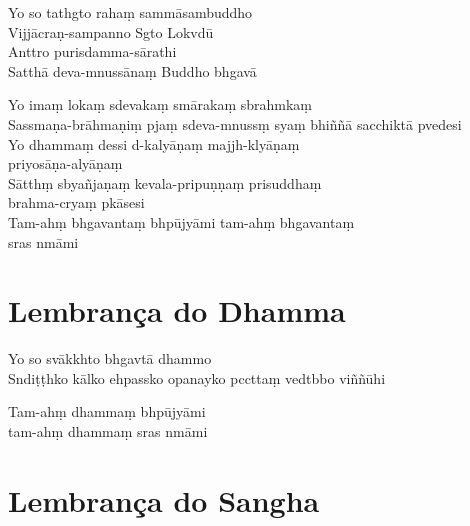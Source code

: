 \begin{leader}
\end{leader}

Yo so tathgto rahaṃ sammāsambuddho\\
Vijjācraṇ-sampanno Sgto Lokvdū\\
Anttro purisdamma-sārathi\\
Satthā deva-mnussānaṃ Buddho bhgavā

Yo imaṃ lokaṃ sdevakaṃ smārakaṃ sbrahmkaṃ\\
Sassmaṇa-brāhmaṇiṃ pjaṃ sdeva-mnussṃ syaṃ bhiññā sacchiktā pvedesi\\
Yo dhammaṃ dessi d-kalyāṇaṃ majjh-klyāṇaṃ\\
priyosāṇa-alyāṇaṃ\\
Sātthṃ sbyañjaṇaṃ kevala-pripuṇṇaṃ prisuddhaṃ\\
brahma-cryaṃ pkāsesi\\

Tam-ahṃ bhgavantaṃ bhpūjyāmi tam-ahṃ bhgavantaṃ\\
sras nmāmi 

\chapter{Lembrança do Dhamma}     %

\begin{leader}
\end{leader}

Yo so svākkhto bhgavtā dhammo\\
Sndiṭṭhko kālko ehpassko opanayko pccttaṃ vedtbbo viññūhi

Tam-ahṃ dhammaṃ bhpūjyāmi\\
\vin tam-ahṃ dhammaṃ sras nmāmi 

\enlargethispage{\baselineskip}
\clearpage

\chapter{Lembrança do Sangha}     %


